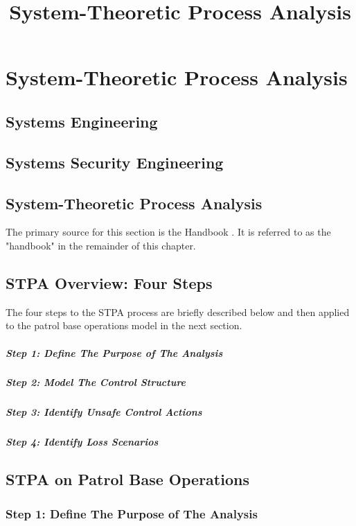 \documentclass[../../main/main.tex]{subfiles}
\begin{document}
\title{System-Theoretic Process Analysis}


\chapter{System-Theoretic Process Analysis}
\section{Systems Engineering}
\section{Systems Security Engineering}
\section{System-Theoretic Process Analysis}
The primary source for this section is the  Handbook \cite{stpa}. It is referred to as the "handbook" in the remainder of this chapter.
\section{STPA Overview: Four Steps}
The four steps to the STPA process are briefly described below and then applied to the patrol base operations model in the next section.
\paragraph*{Step 1: Define The Purpose of The Analysis}
\paragraph*{Step 2: Model The Control Structure}
\paragraph*{Step 3: Identify Unsafe Control Actions}
\paragraph*{Step 4: Identify Loss Scenarios}

\section{STPA on Patrol Base Operations}
\subsection{Step 1: Define The Purpose of The Analysis}
\end{document}
